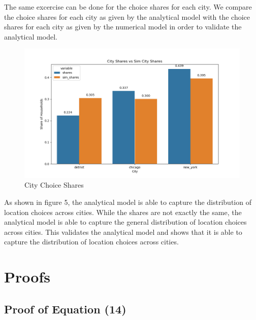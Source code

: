 \documentclass[10pt]{article}
\begin{document}
The same excercise can be done for the choice shares for each city. We compare the choice shares for each city as given by the analytical model with the choice shares for each city as given by the numerical model in order to validate the analytical model.

\begin{figure}
    \centering
    \includegraphics[width=\textwidth]{../simulations/graphs/sim_city_shares.png}
    \caption{City Choice Shares}
    \label{sim_city_shares}
\end{figure}

As shown in figure 5, the analytical model is able to capture the distribution of location choices across cities. While the shares are not exactly the same, the analytical model is able to capture the general distribution of location choices across cities. This validates the analytical model and shows that it is able to capture the distribution of location choices across cities.

\newpage

\section{Proofs}

\subsection{Proof of Equation (14)}
\end{document}
